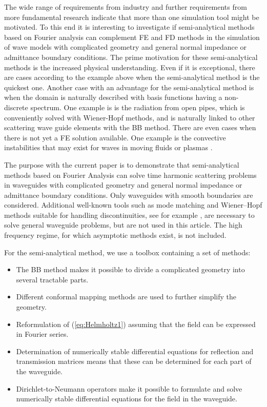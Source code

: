 \documentclass[numreferences]{kluwer}
\begin{document}
The wide range of requirements from industry and further requirements
from more fundamental research indicate that more than one simulation
tool might be motivated. To this end it is interesting to investigate if semi-analytical methods based on Fourier analysis can complement FE and FD methods in the simulation of wave models with complicated geometry and general normal impedance or admittance boundary conditions. The prime motivation for these semi-analytical methods is the increased physical understanding. Even if it is exceptional, there are cases according to the example above when the semi-analytical method is the quickest one. Another case with an advantage for the semi-analytical method is when the domain is naturally described with basis functions having a non-discrete spectrum. One example is is the radiation from open pipes, which is conveniently solved with Wiener-Hopf methods, and is naturally linked to other scattering wave guide elements with the BB method. There are even cases when there is not yet a FE solution available. One example is the convective instabilities that may exist for waves in moving fluids \cite{nilssonbrander1980a} or plasmas \cite{briggs1964}.

The purpose with the current paper is to demonstrate that semi-analytical methods based on Fourier Analysis can solve time harmonic scattering problems in waveguides with complicated geometry and general normal impedance or admittance boundary conditions. Only waveguides with smooth boundaries are considered. Additional well-known tools such as mode matching and Wiener--Hopf methods suitable for handling discontinuities, see for example \cite{jones1986}, are necessary to solve general waveguide problems, but are not used in this article. The high frequency regime, for which asymptotic methods exist, is not included.

For the semi-analytical method, we use a toolbox containing a set of
methods:
\begin{itemize}
\item The BB method makes it possible to divide a complicated geometry
  into several tractable parts.
\item Different conformal mapping methods are used to further simplify
  the geometry.
\item Reformulation of (\ref{eq:Helmholtz1}) assuming that the field
  can be expressed in Fourier series.
\item Determination of numerically stable differential equations for
  reflection and transmission matrices means that these can be
  determined for each part of the waveguide.
\item Dirichlet-to-Neumann operators make it possible to formulate and
  solve numerically stable differential equations for the field in the
  waveguide.
\end{itemize}
\end{document}
